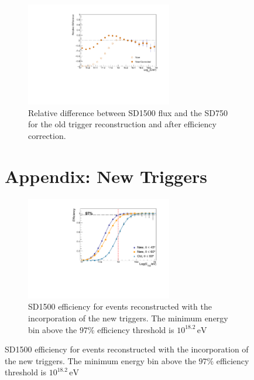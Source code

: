 \documentclass[12pt,a4paper]{article}
\newcommand{\eV}{\, \mathrm{eV}}
\begin{document}
\begin{figure}[]
\begin{figure}[h]
    \begin{center}
        \includegraphics[width=0.7\textwidth]{plots/NewDifference.pdf}
        \caption{Relative difference between SD1500 flux and the SD750 for the old trigger reconstruction and after efficiency correction.
        \label{fig:difference}}
    \end{center}
\end{figure} 


\section*{Appendix: New Triggers}

\begin{figure}[h]
    \begin{center}
        \includegraphics[width=0.7\textwidth]{plots/NewCut.pdf}  
        \caption{SD1500 efficiency for events reconstructed with the incorporation of the new triggers. The minimum energy bin above the $97\%$ efficiency threshold is $10^{18.2}\eV$
        \label{fig:allZenithNew}}
    \end{center}
\end{figure}


\end{figure}
\end{document}
